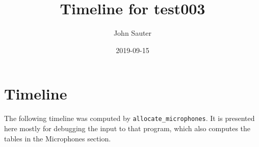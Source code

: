 \documentclass[letterpaper]{article}
\title{Timeline for test003}
\author{John Sauter}
\date{2019-09-15}
\begin{document}
\maketitle
\newpage

\section {Timeline}
The following timeline was computed by {\tt allocate\_microphones}.
It is presented here mostly for debugging the input to that program,
which also computes the tables in the Microphones section.


\end{document}
